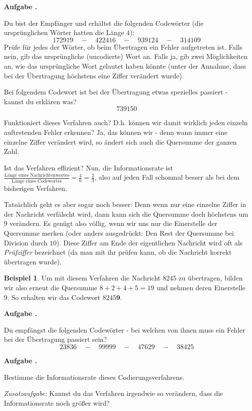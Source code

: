 \documentclass[a4paper,ngerman,12pt]{scrartcl}
\theoremstyle{definition}
\newtheorem{bsp}[defn]{Beispiel}
\theoremstyle{plain}
\theoremstyle{remark}
\newlength{\aufgabenskip}
\newcounter{aufgabennummer}
\newenvironment{aufgabe}[1]{
	\addtocounter{aufgabennummer}{1}
	\textbf{Aufgabe \theaufgabennummer.} \emph{#1} \par
}{\vspace{\aufgabenskip}}
\begin{document}
\begin{aufgabe}{}
	Du bist der Empfänger und erhältst die folgenden Codewörter (die ursprünglichen Wörter hatten die Länge $4$):
		\[172919 \quad-\quad 422416 \quad-\quad 939124  \quad-\quad 314109\]
	Prüfe für jedes der Wörter, ob beim Übertragen ein Fehler aufgetreten ist. Falls nein, gib das ursprüngliche (uncodierte) Wort an. Falls ja, gib zwei Möglichkeiten an, wie das ursprüngliche Wort gelautet haben könnte (unter der Annahme, dass bei der Übertragung höchstens eine Ziffer verändert wurde). 
	
	Bei folgendem Codewort ist bei der Übertragung etwas spezielles passiert - kannst du erklären was?
		\[739150\]
\end{aufgabe}

Funktioniert dieses Verfahren auch? D.h. können wir damit wirklich jeden einzeln auftretenden Fehler erkennen? Ja, das können wir - denn wann immer eine einzelne Ziffer verändert wird, so ändert sich auch die Quersumme der ganzen Zahl. 

Ist das Verfahren effizient? Nun, die Informationsrate ist $\frac{\text{Länge eines Nachrichtenwortes}}{\text{Länge eines Codewortes}} = \frac{4}{6} = \frac{2}{3}$, also auf jeden Fall schonmal besser als bei dem bisherigen Verfahren.

Tatsächlich geht es aber sogar noch besser: Denn wenn nur eine einzelne Ziffer in der Nachricht verfälscht wird, dann kann sich die Quersumme doch höchstens um $9$ verändern. Es genügt also völlig, wenn wir uns nur die Einerstelle der Quersumme merken (oder anders ausgedrückt: Den Rest der Quersumme bei Division durch $10$). Diese Ziffer am Ende der eigentlichen Nachricht wird oft als \emph{Prüfziffer} bezeichnet (da man mit ihr prüfen kann, ob die Nachricht korrekt übertragen wurde).

\begin{bsp}
	Um mit diesem Verfahren die Nachricht $8245$ zu übertragen, bilden wir also erneut die Quersumme $8+2+4+5=19$ und nehmen deren Einerstelle $9$. So erhalten wir das Codewort $8245\textbf{9}$.
\end{bsp}

\begin{aufgabe}{}
	Du empfängst die folgenden Codewörter - bei welchen von ihnen muss ein Fehler bei der Übertragung passiert sein?
		\[23836 \quad-\quad 99999 \quad-\quad 47629 \quad-\quad 38425\]
\end{aufgabe}

\begin{aufgabe}{}
	Bestimme die Informationsrate dieses Codierungsverfahrens.

	\emph{Zusatzaufgabe:} Kannst du das Verfahren irgendwie so verändern, dass die Informationsrate noch größer wird?
\end{aufgabe}
\end{document}
